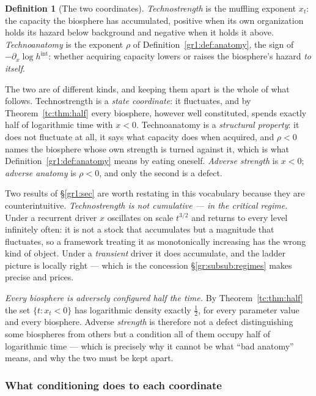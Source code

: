 \documentclass[11pt]{article}
\numberwithin{equation}{section}
\theoremstyle{plain}
\theoremstyle{definition}
\newtheorem{definition}[theorem]{Definition}
\theoremstyle{remark}
\begin{document}
\begin{definition}[The two coordinates]\label{gr:def:coords}
\emph{Technostrength} is the muffling exponent $x_t$: the capacity the
biosphere has accumulated, positive when its own organization holds its
hazard below background and negative when it holds it above.
\emph{Technoanatomy} is the exponent $\rho$ of
Definition~\ref{gr1:def:anatomy}, the sign of
$-\partial_x\log h^{\mathrm{int}}$: whether acquiring capacity lowers or
raises the biosphere's hazard \emph{to itself}.

The two are of different kinds, and keeping them apart is the whole of
what follows. Technostrength is a \emph{state coordinate}: it
fluctuates, and by Theorem~\ref{tc:thm:half} every biosphere, however well constituted, spends exactly half of logarithmic time
with $x<0$. Technoanatomy is a \emph{structural property}: it does not
fluctuate at all, it says what capacity does when acquired, and
$\rho<0$ names the biosphere whose own strength is turned against it,
which is what Definition~\ref{gr1:def:anatomy} means by eating oneself.
\emph{Adverse strength} is $x<0$; \emph{adverse anatomy} is $\rho<0$,
and only the second is a defect.
\end{definition}

Two results of \S\ref{gr1:sec} are worth restating in this vocabulary because
they are counterintuitive. \emph{Technostrength is not cumulative --- in the critical regime.}
Under a recurrent driver $x$ oscillates on scale $t^{3/2}$ and returns
to every level infinitely often: it is not a stock that accumulates but
a magnitude that fluctuates, so a framework treating it as monotonically
increasing has the wrong kind of object. Under a \emph{transient} driver
it does accumulate, and the ladder picture is locally right --- which is
the concession \S\ref{gr:subsub:regimes} makes precise and prices.

\emph{Every biosphere is adversely configured half the time.} By
Theorem~\ref{tc:thm:half} the set $\{t:x_t<0\}$ has logarithmic density
exactly $\tfrac12$, for every parameter value and every biosphere.
Adverse \emph{strength} is therefore not a defect distinguishing some
biospheres from others but a condition all of them occupy half of
logarithmic time --- which is precisely why it cannot be what
``bad anatomy'' means, and why the two must be kept apart.

\subsubsection{What conditioning does to each coordinate}
\label{gr:subsub:measured}
\end{document}

